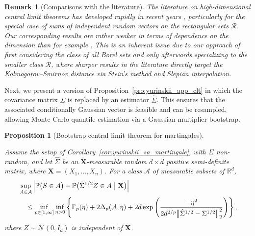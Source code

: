 \documentclass[11pt,lof]{puthesis}
\renewcommand{\P}{\ensuremath{\mathbb{P}}}
\newcommand{\R}{\ensuremath{\mathbb{R}}}
\newcommand{\bX}{\ensuremath{\mathbf{X}}}
\newcommand{\cN}{\ensuremath{\mathcal{N}}}
\newcommand{\cR}{\ensuremath{\mathcal{R}}}
\newcommand{\cA}{\ensuremath{\mathcal{A}}}
\theoremstyle{break}
\newtheorem{proposition}{Proposition}[section]
\newtheorem{remark}{Remark}[section]
\theoremstyle{proof}
\begin{document}
\begin{remark}[Comparisons with the literature]

  The literature on high-dimensional central limit theorems
  has developed rapidly in recent years
  \citep[see][and references therein]{%
    zhai2018high,%
    koike2021notes,%
    buzun2022strong,%
    lopes2022central,%
    chernozhukov2023nearly%
  },
  particularly for the special case of
  sums of independent random vectors
  on the rectangular sets $\cR$.
  Our corresponding results are rather weaker in terms of
  dependence on the dimension than for example
  \citet[Theorem~2.1]{chernozhukov2023nearly}.
  This is an inherent issue due to our approach of first
  considering the class of all Borel sets
  and only afterwards specializing to the smaller class $\cR$,
  where sharper results in the literature directly target the
  Kolmogorov--Smirnov distance via Stein's method and Slepian interpolation.
\end{remark}

Next, we present a version of Proposition~\ref{pro:yurinskii_app_clt} in which
the covariance
matrix $\Sigma$ is replaced by an estimator $\hat \Sigma$. This ensures that
the associated conditionally Gaussian vector is feasible and can be resampled,
allowing Monte Carlo quantile estimation via a Gaussian
multiplier bootstrap.

\begin{proposition}[Bootstrap central limit theorem for martingales]%
  \label{pro:yurinskii_app_bootstrap}

  Assume the setup of Corollary~\ref{cor:yurinskii_sa_martingale},
  with $\Sigma$ non-random,
  and let $\hat \Sigma$ be an $\bX$-measurable random
  $d \times d$ positive semi-definite matrix,
  where $\bX = (X_1, \ldots, X_n)$.
  For a class $\cA$ of measurable subsets of $\R^d$,
  \begin{align*}
    &\sup_{A\in \cA}
    \left|
      \P\big(S \in A\big)
      - \P\big(\hat \Sigma^{1/2} Z \in A \bigm| \bX \big)
    \right| \\
    &\quad\leq
    \inf_{p \in [1,\infty]} \inf_{\eta>0}
    \left\{ \Gamma_p(\eta) + 2 \Delta_p(\cA, \eta)
      + 2d \exp\left(\frac{-\eta^2}
        {2d^{2/p}\big\|\hat \Sigma^{1/2} - \Sigma^{1/2}\big\|_2^2}
      \right)
    \right\},
  \end{align*}
  where $Z \sim \cN(0,I_d)$ is independent of $\bX$.
\end{proposition}
\end{document}
